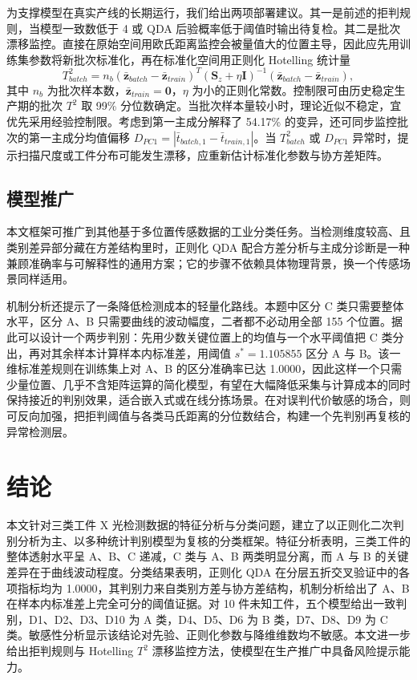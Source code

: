 \documentclass[12pt,a4paper]{article}
\begin{document}
为支撑模型在真实产线的长期运行，我们给出两项部署建议。其一是前述的拒判规则，当模型一致数低于 4 或 QDA 后验概率低于阈值时输出待复检。其二是批次漂移监控。直接在原始空间用欧氏距离监控会被量值大的位置主导，因此应先用训练集参数将新批次标准化，再在标准化空间用正则化 Hotelling 统计量
\begin{equation}
T^2_{batch}=n_b(\bar{\mathbf{z}}_{batch}-\bar{\mathbf{z}}_{train})^{T}(\mathbf{S}_z+\eta\mathbf{I})^{-1}(\bar{\mathbf{z}}_{batch}-\bar{\mathbf{z}}_{train}),
\end{equation}
其中 $n_b$ 为批次样本数，$\bar{\mathbf{z}}_{train}=\mathbf{0}$，$\eta$ 为小的正则化常数。控制限可由历史稳定生产期的批次 $T^2$ 取 99\% 分位数确定。当批次样本量较小时，理论近似不稳定，宜优先采用经验控制限。考虑到第一主成分解释了 54.17\% 的变异，还可同步监控批次的第一主成分均值偏移 $D_{PC1}=|\bar{t}_{batch,1}-\bar{t}_{train,1}|$。当 $T^2_{batch}$ 或 $D_{PC1}$ 异常时，提示扫描尺度或工件分布可能发生漂移，应重新估计标准化参数与协方差矩阵。

\subsection{模型推广}

本文框架可推广到其他基于多位置传感数据的工业分类任务。当检测维度较高、且类别差异部分藏在方差结构里时，正则化 QDA 配合方差分析与主成分诊断是一种兼顾准确率与可解释性的通用方案；它的步骤不依赖具体物理背景，换一个传感场景同样适用。

机制分析还提示了一条降低检测成本的轻量化路线。本题中区分 C 类只需要整体水平，区分 A、B 只需要曲线的波动幅度，二者都不必动用全部 155 个位置。据此可以设计一个两步判别：先用少数关键位置上的均值与一个水平阈值把 C 类分出，再对其余样本计算样本内标准差，用阈值 $s^{*}=1.105855$ 区分 A 与 B。该一维标准差规则在训练集上对 A、B 的区分准确率已达 1.0000，因此这样一个只需少量位置、几乎不含矩阵运算的简化模型，有望在大幅降低采集与计算成本的同时保持接近的判别效果，适合嵌入式或在线分拣场景。在对误判代价敏感的场合，则可反向加强，把拒判阈值与各类马氏距离的分位数结合，构建一个先判别再复核的异常检测层。

\section{结论}

本文针对三类工件 X 光检测数据的特征分析与分类问题，建立了以正则化二次判别分析为主、以多种统计判别模型为复核的分类框架。特征分析表明，三类工件的整体透射水平呈 A、B、C 递减，C 类与 A、B 两类明显分离，而 A 与 B 的关键差异在于曲线波动程度。分类结果表明，正则化 QDA 在分层五折交叉验证中的各项指标均为 1.0000，其判别力来自类别方差与协方差结构，机制分析给出了 A、B 在样本内标准差上完全可分的阈值证据。对 10 件未知工件，五个模型给出一致判别，D1、D2、D3、D10 为 A 类，D4、D5、D6 为 B 类，D7、D8、D9 为 C 类。敏感性分析显示该结论对先验、正则化参数与降维维数均不敏感。本文进一步给出拒判规则与 Hotelling $T^2$ 漂移监控方法，使模型在生产推广中具备风险提示能力。
\end{document}
